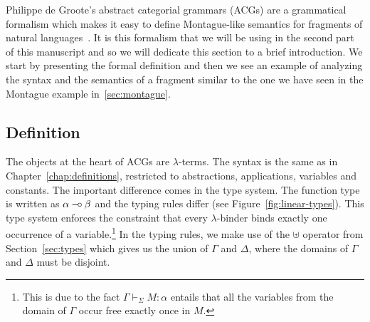 Philippe de Groote's abstract categorial grammars (ACGs) are a grammatical
formalism which makes it easy to define Montague-like semantics for
fragments of natural languages~\cite{de2001towards}. It is this formalism
that we will be using in the second part of this manuscript and so we will
dedicate this section to a brief introduction. We start by presenting the
formal definition and then we see an example of analyzing the syntax and
the semantics of a fragment similar to the one we have seen in the Montague
example in~\ref{sec:montague}.


\subsection{Definition}
\label{ssec:acg-definition}

The objects at the heart of ACGs are $\lambda$-terms. The syntax is the
same as in Chapter~\ref{chap:definitions}, restricted to abstractions,
applications, variables and constants. The important difference comes in
the type system. The function type is written as $\alpha \mathbin{{-}\mkern-3.5mu{\circ}} \beta$ and
the typing rules differ (see Figure~\ref{fig:linear-types}). This type
system enforces the constraint that every $\lambda$-binder binds exactly
one occurrence of a variable.\footnote{This is due to the fact
  $\Gamma \vdash_\Sigma M : \alpha$ entails that all the variables from the
  domain of $\Gamma$ occur free exactly once in $M$.} In the typing rules,
we make use of the $\uplus$ operator from Section~\ref{sec:types} which
gives us the union of $\Gamma$ and $\Delta$, where the domains of $\Gamma$
and $\Delta$ must be disjoint.

